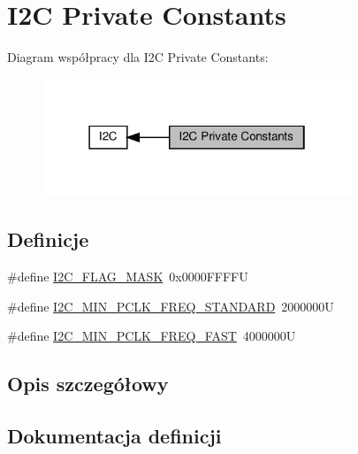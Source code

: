 \hypertarget{group___i2_c___private___constants}{}\section{I2C Private Constants}
\label{group___i2_c___private___constants}
Diagram współpracy dla I2C Private Constants\+:\nopagebreak
\begin{figure}[H]
\begin{center}
\leavevmode
\includegraphics[width=262pt]{group___i2_c___private___constants}
\end{center}
\end{figure}
\subsection*{Definicje}
\begin{DoxyCompactItemize}
\item 
\#define \hyperlink{group___i2_c___private___constants_gafbc0a6e4113be03100fbae1314a8b395}{I2\+C\+\_\+\+F\+L\+A\+G\+\_\+\+M\+A\+SK}~0x0000\+F\+F\+F\+FU
\item 
\#define \hyperlink{group___i2_c___private___constants_ga6c86f9bd6ba54caa5cd13163ae49f753}{I2\+C\+\_\+\+M\+I\+N\+\_\+\+P\+C\+L\+K\+\_\+\+F\+R\+E\+Q\+\_\+\+S\+T\+A\+N\+D\+A\+RD}~2000000U
\item 
\#define \hyperlink{group___i2_c___private___constants_gacda1638db89dd9edf880f012ec185bac}{I2\+C\+\_\+\+M\+I\+N\+\_\+\+P\+C\+L\+K\+\_\+\+F\+R\+E\+Q\+\_\+\+F\+A\+ST}~4000000U
\end{DoxyCompactItemize}


\subsection{Opis szczegółowy}


\subsection{Dokumentacja definicji}
\mbox{\label{group___i2_c___private___constants_gafbc0a6e4113be03100fbae1314a8b395}} 
